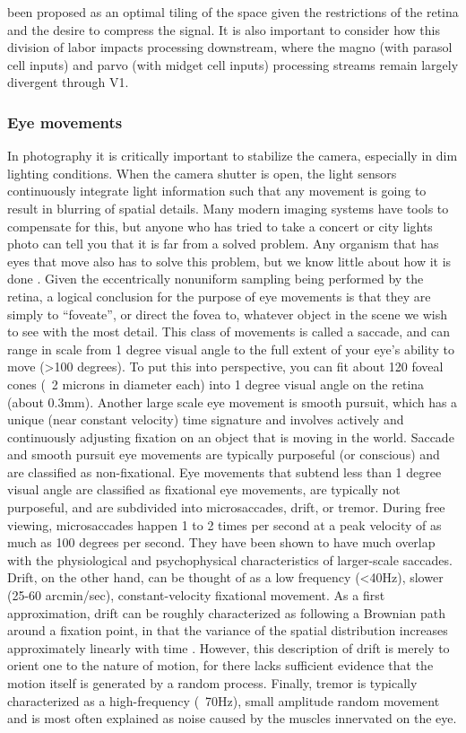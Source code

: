 been proposed as an optimal tiling of the space given the restrictions of the retina \cite{mcintosh2016deep} and the desire to compress the signal. It is also important to consider how this division of labor impacts processing downstream, where the magno (with parasol cell inputs) and parvo (with midget cell inputs) processing streams remain largely divergent through V1.

\subsubsection{Eye movements}
In photography it is critically important to stabilize the camera, especially in dim lighting conditions. When the camera shutter is open, the light sensors continuously integrate light information such that any movement is going to result in blurring of spatial details. Many modern imaging systems have tools to compensate for this, but anyone who has tried to take a concert or city lights photo can tell you that it is far from a solved problem. Any organism that has eyes that move also has to solve this problem, but we know little about how it is done \cite{olshausen2010does, burak2010bayesian, placeholder-alex?}. Given the eccentrically nonuniform sampling being performed by the retina, a logical conclusion for the purpose of eye movements is that they are simply to “foveate”, or direct the fovea to, whatever object in the scene we wish to see with the most detail. This class of movements is called a saccade, and can range in scale from 1 degree visual angle to the full extent of your eye’s ability to move (>100 degrees). To put this into perspective, you can fit about 120 foveal cones (~2 microns in diameter each) into 1 degree visual angle on the retina (about 0.3mm). Another large scale eye movement is smooth pursuit, which has a unique (near constant velocity) time signature and involves actively and continuously adjusting fixation on an object that is moving in the world. Saccade and smooth pursuit eye movements are typically purposeful (or conscious) and are classified as non-fixational. Eye movements that subtend less than 1 degree visual angle are classified as fixational eye movements, are typically not purposeful, and are subdivided into microsaccades, drift, or tremor. During free viewing, microsaccades happen 1 to 2  times per second at a peak velocity of as much as 100 degrees per second. They have been shown to have much overlap with the physiological and psychophysical characteristics of larger-scale saccades. Drift, on the other hand, can be thought of as a low frequency (<40Hz), slower (25-60 arcmin/sec), constant-velocity fixational movement. As a first approximation, drift can be roughly characterized as following a Brownian path around a fixation point, in that the variance of the spatial distribution increases approximately linearly with time \cite{rucci2015unsteady}. However, this description of drift is merely to orient one to the nature of motion, for there lacks sufficient evidence that the motion itself is generated by a random process. Finally, tremor is typically characterized as a high-frequency (~70Hz), small amplitude random movement and is most often explained as noise caused by the muscles innervated on the eye. 
